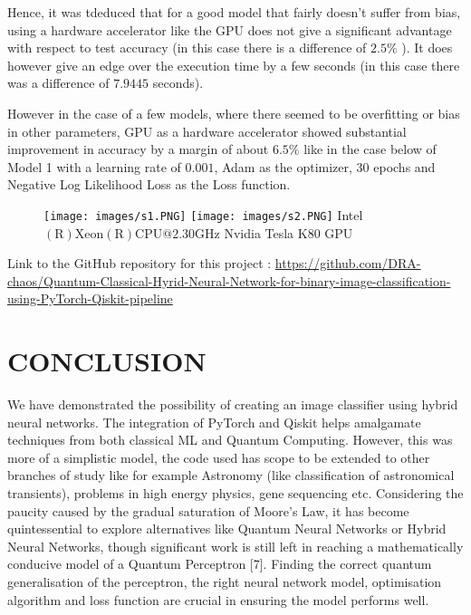 \documentclass[10pt]{article}
\begin{document}




Hence, it was tdeduced that for a good model that fairly doesn't suffer from bias, using a hardware accelerator like the GPU does not give a significant advantage with respect to test accuracy (in this case there is a difference of $2.5 \%$ ). It does however give an edge over the execution time by a few seconds (in this case there was a difference of $7.9445$ seconds).

However in the case of a few models, where there seemed to be overfitting or bias in other parameters, GPU as a hardware accelerator showed substantial improvement in accuracy by a margin of about $6.5 \%$ like in the case below of Model 1 with a learning rate of $0.001$, Adam as the optimizer, 30 epochs and Negative Log Likelihood Loss as the Loss function.

\begin{figure}[!h]

\texttt{[image: images/s1.PNG]}
\texttt{[image: images/s2.PNG]}
Intel $(\mathrm{R}) \mathrm{Xeon}(\mathrm{R}) \mathrm{CPU} @ 2.30 \mathrm{GHz}$ \hspace{11em} Nvidia Tesla K80 GPU



\end{figure}

Link to the GitHub repository for this project : \href{https://github.com/DRA-chaos/Quantum-Classical-Hyrid-Neural-Network-for-binary-image-classification-using-PyTorch-Qiskit-pipeline}{https://github.com/DRA-chaos/Quantum-Classical-Hyrid-Neural-Network-for-binary-image-classification-using-PyTorch-Qiskit-pipeline}



\section{CONCLUSION}
We have demonstrated the possibility of creating an image classifier using hybrid neural networks. The integration of PyTorch and Qiskit helps amalgamate techniques from both classical ML and Quantum Computing. However, this was more of a simplistic model, the code used has scope to be extended to other branches of study like for example Astronomy (like classification of astronomical transients), problems in high energy physics, gene sequencing etc. Considering the paucity caused by the gradual saturation of Moore's Law, it has become quintessential to explore alternatives like Quantum Neural Networks or Hybrid Neural Networks, though significant work is still left in reaching a mathematically conducive model of a Quantum Perceptron [7]. Finding the correct quantum generalisation of the perceptron, the right neural network model, optimisation algorithm and loss function are crucial in ensuring the model performs well.
\end{document}
